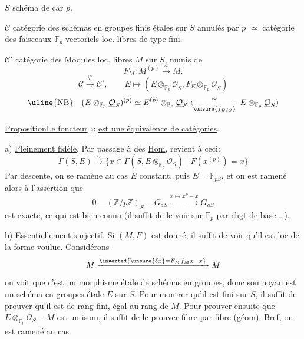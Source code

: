 $S$ schéma de car $p$.

$\mathcal C$ catégorie des schémas en groupes finis étales
 sur $S$ annulés par $p$
$\simeq$ catégorie des faisceaux 
$\mathbb F_p$-vectoriels loc. libres de type fini.

$\mathcal C'$ catégorie des Modules loc. libres $M$ sur $S$, munis de
\[
F_M:M^{(p)}\xrightarrow{\sim}M.
\]
\[
\mathcal C\xrightarrow{\varphi}\mathcal C',
\qquad E\longmapsto
(E\otimes_{\mathbb F_p}\underline{\mathcal O}_S,
F_E\otimes_{\mathbb F_p}\underline{\mathcal O}_S)
\]
\[
\uline{\text{NB}}\quad
(E\otimes_{\mathbb F_p}\underline{\mathcal O}_S)^{(p)}
\simeq E^{(p)}\otimes_{\mathbb F_p}\underline{\mathcal O}_S
\xleftarrow[\unsure{f_{E/S}}]{\sim}
E\otimes_{\mathbb F_p}\underline{\mathcal O}_S)
\]

\uline{Proposition}\quad \uline{Le foncteur} $\varphi$
\uline{est une équivalence de catégories}.

a) \uline{Pleinement fidèle}. 
Par passage à des \uline{Hom}, revient à ceci:
\[
\Gamma(S,E)\xrightarrow{\sim}
\{x\in\Gamma(S,E\otimes_{\mathbb F_p}\mathcal O_S)
\mid F(x^{(p)})=x\}
\]
Par descente, on se ramène au cas $E$ constant, puis
$E=\mathbb F_{pS}$, et on est ramené alors à l'assertion que
\[
0-(\mathbb Z/p\mathbb Z)_S-G_{aS}
\xrightarrow{x\mapsto x^p-x}G_{aS}
\]
est exacte, ce qui est bien connu (il suffit de le voir sur
$\mathbb F_p$ par chgt de base \dots).

b) Essentiellement surjectif. Si $(M,F)$ est donné, il suffit
de voir qu'il est \uline{loc} de la forme voulue.
Considérons
\[
M\xrightarrow{\inserted{\unsure{\delta x}=F_Mf_Mx-x}}M
\]
on voit que c'est un morphisme étale de
schémas en groupes, donc son noyau est un schéma en groupes étale
$E$ sur $S$. Pour montrer qu'il est fini sur $S$, il suffit de
prouver qu'il est de rang
  
fini, égal au rang de $M$. Pour prouver ensuite que
$E\otimes_{\mathbb F_p}\mathcal O_S-M$ est un isom, il suffit de
le prouver fibre par fibre (géom). Bref, on est ramené au cas
